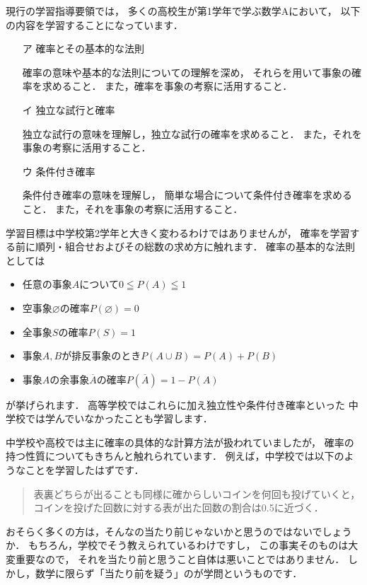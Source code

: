 \documentclass[./main]{subfiles} %
\theoremstyle{definition}
\begin{document}

現行の学習指導要領では，
多くの高校生が第1学年で学ぶ数学Aにおいて，
以下の内容を学習することになっています．
\begin{itemize}
\item[ア]確率とその基本的な法則

確率の意味や基本的な法則についての理解を深め，
それらを用いて事象の確率を求めること．
また，確率を事象の考察に活用すること．
\item[イ]独立な試行と確率

独立な試行の意味を理解し，独立な試行の確率を求めること．
また，それを事象の考察に活用すること．
\item[ウ]条件付き確率

条件付き確率の意味を理解し，
簡単な場合について条件付き確率を求めること．
また，それを事象の考察に活用すること．
\end{itemize}
学習目標は中学校第2学年と大きく変わるわけではありませんが，
確率を学習する前に順列・組合せおよびその総数の求め方に触れます．
確率の基本的な法則としては
\begin{itemize}
\item 任意の事象$A$について$0\leqq P(A)\leqq1$
\item 空事象$\varnothing$の確率$P(\varnothing)=0$
\item 全事象$S$の確率$P(S)=1$
\item 事象$A,B$が排反事象のとき$P(A\cup B)=P(A)+P(B)$
\item 事象$A$の余事象$\overline{A}$の確率$P(\overline{A})=1-P(A)$
\end{itemize}
が挙げられます．
高等学校ではこれらに加え独立性や条件付き確率といった
中学校では学んでいなかったことも学習します．


中学校や高校では主に確率の具体的な計算方法が扱われていましたが，
確率の持つ性質についてもきちんと触れられています．
例えば，中学校では以下のようなことを学習したはずです．
\begin{quote}
表裏どちらが出ることも同様に確からしいコインを何回も投げていくと，
コインを投げた回数に対する表が出た回数の割合は0.5に近づく．
\end{quote}
おそらく多くの方は，そんなの当たり前じゃないかと思うのではないでしょうか．
もちろん，学校でそう教えられているわけですし，
この事実そのものは大変重要なので，
それを当たり前と思うこと自体は悪いことではありません．
しかし，数学に限らず「当たり前を疑う」のが学問というものです．
\end{document}
